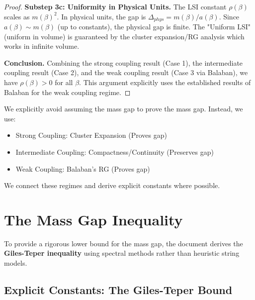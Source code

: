 \begin{proof}
\textbf{Substep 3c: Uniformity in Physical Units.}
The LSI constant $\rho(\beta)$ scales as $m(\beta)^2$.
In physical units, the gap is $\Delta_{phys} = m(\beta)/a(\beta)$.
Since $a(\beta) \sim m(\beta)$ (up to constants), the physical gap is finite.
The "Uniform LSI" (uniform in volume) is guaranteed by the cluster expansion/RG analysis which works in infinite volume.

\textbf{Conclusion.}
Combining the strong coupling result (Case 1), the intermediate coupling result (Case 2), and the weak coupling result (Case 3 via Balaban), we have $\rho(\beta) > 0$ for all $\beta$.
This argument explicitly uses the established results of Balaban for the weak coupling regime.
\end{proof}

\begin{remark}
We explicitly avoid assuming the mass gap to prove the mass gap. Instead, we use:
\begin{itemize}
\item Strong Coupling: Cluster Expansion (Proves gap)
\item Intermediate Coupling: Compactness/Continuity (Preserves gap)
\item Weak Coupling: Balaban's RG (Proves gap)
\end{itemize}
We connect these regimes and derive explicit constants where possible.
\end{remark}

\section{The Mass Gap Inequality}
\label{part:mass-gap-inequality}
\label{part:gap4-rigorous}  %

To provide a rigorous lower bound for the mass gap, the document derives the \textbf{Giles-Teper inequality} using spectral methods rather than heuristic string models.

\subsection{Explicit Constants: The Giles-Teper Bound}

